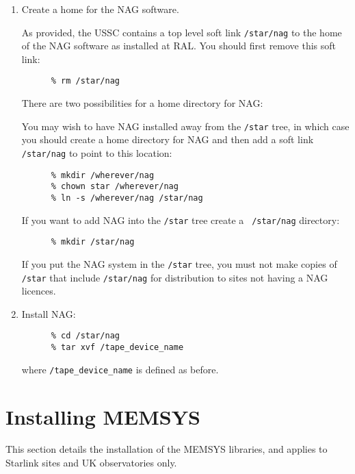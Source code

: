 \begin{enumerate}

\item Create a home for the NAG software. 

As provided, the USSC contains a top level soft link {\tt /star/nag} to the
home of the NAG software as installed at RAL.  You should first remove
this soft link:

\begin{verbatim}
      % rm /star/nag
\end{verbatim}

There are two possibilities for a home directory for NAG:

You may wish to have NAG installed away from the {\tt /star} tree, in which
case you should create a home directory for NAG and then add a soft
link {\tt /star/nag} to point to this location:

\begin{verbatim}
      % mkdir /wherever/nag
      % chown star /wherever/nag
      % ln -s /wherever/nag /star/nag
\end{verbatim}

If you want to add NAG into the {\tt /star} tree create a {\tt
/star/nag} directory:

\begin{verbatim}
      % mkdir /star/nag
\end{verbatim}

If you put the NAG system in the {\tt /star} tree, you must not make copies
of {\tt /star} that include {\tt /star/nag} for distribution to sites
not having a NAG licences.

\item Install NAG:

\begin{verbatim}
      % cd /star/nag
      % tar xvf /tape_device_name
\end{verbatim}

where \verb+/tape_device_name+ is defined as before.

\end{enumerate}

\section{Installing MEMSYS}
\label{s:imemsys}

This section details the installation of the MEMSYS libraries, and
applies to Starlink sites and UK observatories only.

